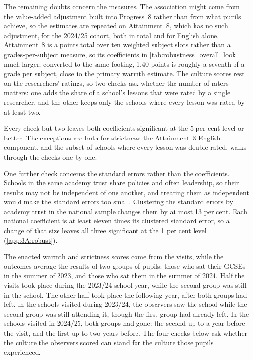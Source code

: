 The remaining doubts concern the measures. The association might come from the value-added adjustment built into Progress~8 rather than from what pupils achieve, so the estimates are repeated on Attainment~8, which has no such adjustment, for the 2024/25 cohort, both in total and for English alone. Attainment~8 is a points total over ten weighted subject slots rather than a grades-per-subject measure, so its coefficients in \cref{tab:robustness_overall} look much larger; converted to the same footing, 1.40 points is roughly a seventh of a grade per subject, close to the primary warmth estimate. The culture scores rest on the researchers' ratings, so two checks ask whether the number of raters matters: one adds the share of a school's lessons that were rated by a single researcher, and the other keeps only the schools where every lesson was rated by at least two.

Every check but two leaves both coefficients significant at the 5 per cent level or better. The exceptions are both for strictness: the Attainment~8 English component, and the subset of schools where every lesson was double-rated.  walks through the checks one by one.

One further check concerns the standard errors rather than the coefficients. Schools in the same academy trust share policies and often leadership, so their results may not be independent of one another, and treating them as independent would make the standard errors too small. Clustering the standard errors by academy trust in the national sample changes them by at most 13 per cent. Each national coefficient is at least eleven times its clustered standard error, so a change of that size leaves all three significant at the 1 per cent level (\cref{app:3A:robust}).



The enacted warmth and strictness scores come from the visits, while the outcomes average the results of two groups of pupils: those who sat their GCSEs in the summer of 2023, and those who sat them in the summer of 2024. Half the visits took place during the 2023/24 school year, while the second group was still in the school. The other half took place the following year, after both groups had left. In the schools visited during 2023/24, the observers saw the school while the second group was still attending it, though the first group had already left. In the schools visited in 2024/25, both groups had gone: the second up to a year before the visit, and the first up to two years before. The four checks below ask whether the culture the observers scored can stand for the culture those pupils experienced.

